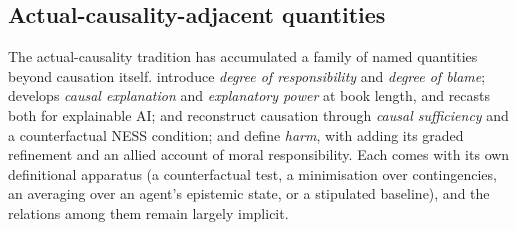 \subsection{Actual-causality-adjacent quantities}
\label{sec:recovering-ac}

The actual-causality tradition has accumulated a family of named quantities beyond
causation itself. \citet{chocklerResponsibilityBlameStructuralModel2004} introduce
\emph{degree of responsibility} and \emph{degree of blame}; \citet{actualCausalityHalpern}
develops \emph{causal explanation} and \emph{explanatory power} at book length, and
\citet{beckersExplanationsXAI2022} recasts both for explainable AI;
\citet{beckersSufficiency2021} and \citet{beckersNESS2021} reconstruct causation through
\emph{causal sufficiency} and a counterfactual NESS condition; and
\citet{beckersHarm2022} define \emph{harm}, with \citet{beckersQuantifyingHarm2023} adding
its graded refinement and \citet{beckersMoralResponsibility2023} an allied account of
moral responsibility. Each comes with its own definitional apparatus (a
counterfactual test, a minimisation over contingencies, an averaging over an agent's
epistemic state, or a stipulated baseline), and the relations among them remain largely
implicit.

